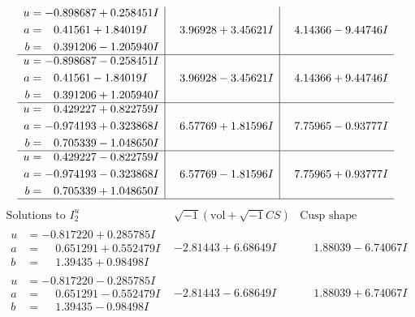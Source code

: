 \documentclass[1p]{elsarticle_modified}
\theoremstyle{definition}
\newcommand{\I}{\sqrt{-1}}
\begin{document}
$$\begin{array}{c|c|c}
\begin{aligned}
u &= -0.898687 + 0.258451 I \\
a &= \phantom{-}0.41561 + 1.84019 I \\
b &= \phantom{-}0.391206 - 1.205940 I\end{aligned}
 & \phantom{-}3.96928 + 3.45621 I & \phantom{-}4.14366 - 9.44746 I \\ \hline\begin{aligned}
u &= -0.898687 - 0.258451 I \\
a &= \phantom{-}0.41561 - 1.84019 I \\
b &= \phantom{-}0.391206 + 1.205940 I\end{aligned}
 & \phantom{-}3.96928 - 3.45621 I & \phantom{-}4.14366 + 9.44746 I \\ \hline\begin{aligned}
u &= \phantom{-}0.429227 + 0.822759 I \\
a &= -0.974193 + 0.323868 I \\
b &= \phantom{-}0.705339 - 1.048650 I\end{aligned}
 & \phantom{-}6.57769 + 1.81596 I & \phantom{-}7.75965 - 0.93777 I \\ \hline\begin{aligned}
u &= \phantom{-}0.429227 - 0.822759 I \\
a &= -0.974193 - 0.323868 I \\
b &= \phantom{-}0.705339 + 1.048650 I\end{aligned}
 & \phantom{-}6.57769 - 1.81596 I & \phantom{-}7.75965 + 0.93777 I\\
 \hline 
 \end{array}$$\newpage$$\begin{array}{c|c|c}  
\text{Solutions to }I^u_{2}& \I (\text{vol} + \sqrt{-1}CS) & \text{Cusp shape}\\
 \hline 
\begin{aligned}
u &= -0.817220 + 0.285785 I \\
a &= \phantom{-}0.651291 + 0.552479 I \\
b &= \phantom{-}1.39435 + 0.98498 I\end{aligned}
 & -2.81443 + 6.68649 I & \phantom{-}1.88039 - 6.74067 I \\ \hline\begin{aligned}
u &= -0.817220 - 0.285785 I \\
a &= \phantom{-}0.651291 - 0.552479 I \\
b &= \phantom{-}1.39435 - 0.98498 I\end{aligned}
 & -2.81443 - 6.68649 I & \phantom{-}1.88039 + 6.74067 I \\ \hline\begin{aligned}

\end{aligned}
\end{array}$$
\end{document}
